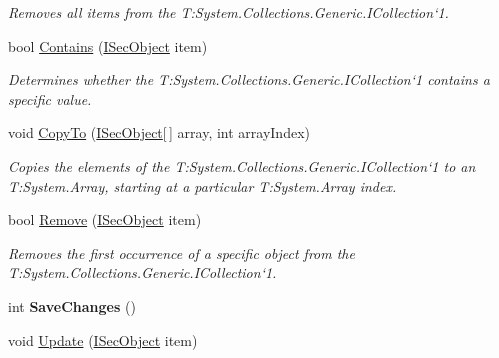 \begin{DoxyCompactItemize}
\begin{DoxyCompactList}\small\item\em Removes all items from the T\+:\+System.\+Collections.\+Generic.\+I\+Collection`1. \end{DoxyCompactList}\item 
bool \hyperlink{class_security_1_1_entity_framework_1_1_collections_1_1_sec_object_collection_a41da3889a4c5935d51c523244b133339}{Contains} (\hyperlink{interface_security_1_1_interfaces_1_1_model_1_1_i_sec_object}{I\+Sec\+Object} item)
\begin{DoxyCompactList}\small\item\em Determines whether the T\+:\+System.\+Collections.\+Generic.\+I\+Collection`1 contains a specific value. \end{DoxyCompactList}\item 
void \hyperlink{class_security_1_1_entity_framework_1_1_collections_1_1_sec_object_collection_a0226da816be691748ba51c0729196be0}{Copy\+To} (\hyperlink{interface_security_1_1_interfaces_1_1_model_1_1_i_sec_object}{I\+Sec\+Object}\mbox{[}$\,$\mbox{]} array, int array\+Index)
\begin{DoxyCompactList}\small\item\em Copies the elements of the T\+:\+System.\+Collections.\+Generic.\+I\+Collection`1 to an T\+:\+System.\+Array, starting at a particular T\+:\+System.\+Array index. \end{DoxyCompactList}\item 
bool \hyperlink{class_security_1_1_entity_framework_1_1_collections_1_1_sec_object_collection_aed554f3f59ee008059b0d403bd620c89}{Remove} (\hyperlink{interface_security_1_1_interfaces_1_1_model_1_1_i_sec_object}{I\+Sec\+Object} item)
\begin{DoxyCompactList}\small\item\em Removes the first occurrence of a specific object from the T\+:\+System.\+Collections.\+Generic.\+I\+Collection`1. \end{DoxyCompactList}\item 
\mbox{\label{class_security_1_1_entity_framework_1_1_collections_1_1_sec_object_collection_a07168efa57d092618a69289f667e5e65}} 
int {\bfseries Save\+Changes} ()
\item 
void \hyperlink{class_security_1_1_entity_framework_1_1_collections_1_1_sec_object_collection_a4dc14e0cfa65f7365aeaa00733299a0f}{Update} (\hyperlink{interface_security_1_1_interfaces_1_1_model_1_1_i_sec_object}{I\+Sec\+Object} item)

\end{DoxyCompactItemize}
